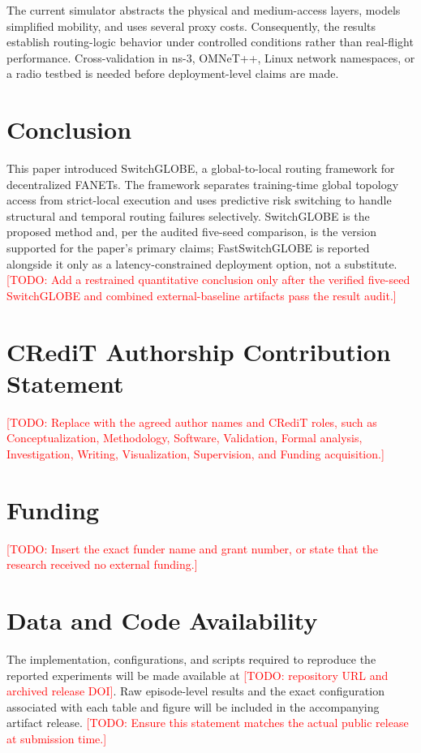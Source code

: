 \documentclass[preprint,12pt]{elsarticle}
\newcommand{\method}{SwitchGLOBE}
\newcommand{\fastmethod}{FastSwitchGLOBE}
\newcommand{\todo}[1]{\textcolor{red}{[TODO: #1]}}
\begin{document}
The current simulator abstracts the physical and medium-access layers, models simplified mobility, and uses several proxy costs. Consequently, the results establish routing-logic behavior under controlled conditions rather than real-flight performance. Cross-validation in ns-3, OMNeT++, Linux network namespaces, or a radio testbed is needed before deployment-level claims are made.

\section{Conclusion}

This paper introduced \method, a global-to-local routing framework for decentralized FANETs. The framework separates training-time global topology access from strict-local execution and uses predictive risk switching to handle structural and temporal routing failures selectively. \method{} is the proposed method and, per the audited five-seed comparison, is the version supported for the paper's primary claims; \fastmethod{} is reported alongside it only as a latency-constrained deployment option, not a substitute. \todo{Add a restrained quantitative conclusion only after the verified five-seed SwitchGLOBE and combined external-baseline artifacts pass the result audit.}

\section*{CRediT Authorship Contribution Statement}

\todo{Replace with the agreed author names and CRediT roles, such as Conceptualization, Methodology, Software, Validation, Formal analysis, Investigation, Writing, Visualization, Supervision, and Funding acquisition.}

\section*{Funding}

\todo{Insert the exact funder name and grant number, or state that the research received no external funding.}

\section*{Data and Code Availability}

The implementation, configurations, and scripts required to reproduce the reported experiments will be made available at \todo{repository URL and archived release DOI}. Raw episode-level results and the exact configuration associated with each table and figure will be included in the accompanying artifact release. \todo{Ensure this statement matches the actual public release at submission time.}
\end{document}
